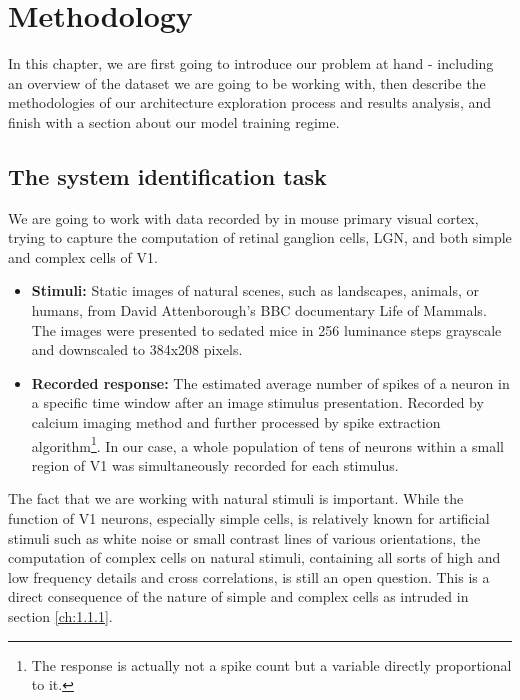 \chapter{Methodology}\label{ch:4}

In this chapter, we are first going to introduce our problem at hand - including an overview of the dataset we are going to be working with, then describe the methodologies of our architecture exploration process and results analysis, and finish with a section about our model training regime.

\section{The system identification task}

We are going to work with data recorded by \cite{antolik} in mouse primary visual cortex, trying to capture the computation of retinal ganglion cells, LGN, and both simple and complex cells of V1.

\begin{itemize}
	
	\item\textbf{Stimuli:} Static images of natural scenes, such as landscapes, animals, or humans, from David Attenborough’s BBC documentary Life of Mammals. The images were presented to sedated mice in 256 luminance steps grayscale and downscaled to 384x208 pixels.
	
	\item\textbf{Recorded response:} The estimated average number of spikes of a neuron in a specific time window after an image stimulus presentation. Recorded by calcium imaging method and further processed by spike extraction algorithm\footnote{The response is actually not a spike count but a variable directly proportional to it.}. In our case, a whole population of tens of neurons within a small region of V1 was simultaneously recorded for each stimulus.
	
\end{itemize}

The fact that we are working with natural stimuli is important. While the function of V1 neurons, especially simple cells, is relatively known for artificial stimuli such as white noise or small contrast lines of various orientations, the computation of complex cells on natural stimuli, containing all sorts of high and low frequency details and cross correlations, is still an open question. This is a direct consequence of the nature of simple and complex cells as intruded in section \ref{ch:1.1.1}. 


